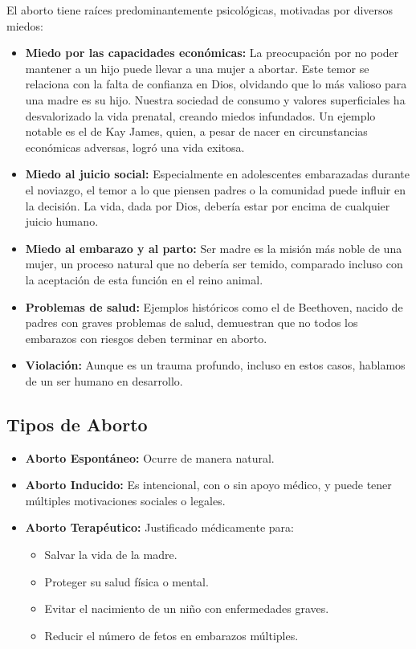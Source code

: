 \documentclass[
  jou,
  floatsintext,
  longtable,
  a4paper,
  nolmodern,
  notxfonts,
  notimes,
  colorlinks=true,linkcolor=blue,citecolor=blue,urlcolor=blue]{apa7}
\providecommand{\tightlist}{%
  \setlength{\itemsep}{0pt}\setlength{\parskip}{0pt}}
\begin{document}
El aborto tiene raíces predominantemente psicológicas, motivadas por
diversos miedos:

\begin{itemize}
\item
  \textbf{Miedo por las capacidades económicas:} La preocupación por no
  poder mantener a un hijo puede llevar a una mujer a abortar. Este
  temor se relaciona con la falta de confianza en Dios, olvidando que lo
  más valioso para una madre es su hijo. Nuestra sociedad de consumo y
  valores superficiales ha desvalorizado la vida prenatal, creando
  miedos infundados. Un ejemplo notable es el de Kay James, quien, a
  pesar de nacer en circunstancias económicas adversas, logró una vida
  exitosa.
\item
  \textbf{Miedo al juicio social:} Especialmente en adolescentes
  embarazadas durante el noviazgo, el temor a lo que piensen padres o la
  comunidad puede influir en la decisión. La vida, dada por Dios,
  debería estar por encima de cualquier juicio humano.
\item
  \textbf{Miedo al embarazo y al parto:} Ser madre es la misión más
  noble de una mujer, un proceso natural que no debería ser temido,
  comparado incluso con la aceptación de esta función en el reino
  animal.
\item
  \textbf{Problemas de salud:} Ejemplos históricos como el de Beethoven,
  nacido de padres con graves problemas de salud, demuestran que no
  todos los embarazos con riesgos deben terminar en aborto.
\item
  \textbf{Violación:} Aunque es un trauma profundo, incluso en estos
  casos, hablamos de un ser humano en desarrollo.
\end{itemize}

\subsection{Tipos de Aborto}\label{tipos-de-aborto}

\begin{itemize}
\tightlist
\item
  \textbf{Aborto Espontáneo:} Ocurre de manera natural.
\item
  \textbf{Aborto Inducido:} Es intencional, con o sin apoyo médico, y
  puede tener múltiples motivaciones sociales o legales.
\item
  \textbf{Aborto Terapéutico:} Justificado médicamente para:

  \begin{itemize}
  \tightlist
  \item
    Salvar la vida de la madre.
  \item
    Proteger su salud física o mental.
  \item
    Evitar el nacimiento de un niño con enfermedades graves.
  \item
    Reducir el número de fetos en embarazos múltiples.
  \end{itemize}
\end{itemize}
\end{document}
